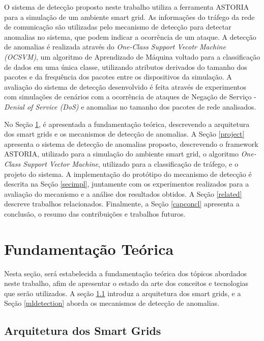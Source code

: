 \documentclass[12pt]{article}
\begin{document}
O sistema de detecção proposto neste trabalho utiliza a ferramenta ASTORIA \cite{wermann2015astoria} para a simulação de um ambiente smart grid. As informações do tráfego da rede de comunicação são utilizadas pelo mecanismo de detecção para detectar anomalias no sistema, que podem indicar a ocorrência de um ataque. A detecção de anomalias é realizada através do \emph{One-Class Support Vecotr Machine (OCSVM)}, um algoritmo de Aprendizado de Máquina voltado para a classificação de dados em uma única classe, utilizando atributos derivados do tamanho dos pacotes e da frequência dos pacotes entre os dispositivos da simulação. A avaliação do sistema de detecção desenvolvido é feita através de experimentos com simulações de cenários com a ocorrência de ataques de Negação de Serviço - \emph{Denial of Service (DoS)} e anomalias no tamanho dos pacotes de rede analisados.

No Seção \ref{stateofart}, é apresentada a fundamentação teórica, descrevendo a arquitetura dos smart grids e os mecanismos de detecção de anomalias. A Seção \ref{project} apresenta o sistema de detecção de anomalias proposto, descrevendo o framework ASTORIA, utilizado para a simulação do ambiente smart grid, o algoritmo \emph{One-Class Support Vector Machine}, utilizado para a classificação de tráfego, e o projeto do sistema. A implementação do protótipo do mecanismo de detecção é descrita na Seção \ref{secimpl}, juntamente com os experimentos realizados para a avaliação do mecanismo e a análise dos resultados obtidos. A Seção \ref{related} descreve trabalhos relacionados. Finalmente, a Seção \ref{capconcl} apresenta a conclusão, o resumo das contribuições e trabalhos futuros.

\section{Fundamentação Teórica}
\label{stateofart}
Nesta seção, será estabelecida a fundamentação teórica dos tópicos abordados neste trabalho, afim de apresentar o estado da arte dos conceitos e tecnologias que serão utilizados. A seção \ref{secarq} introduz a arquitetura dos smart grids, e a Seção \ref{mldetection} aborda os mecanismos de detecção de anomalias.

\subsection{Arquitetura dos Smart Grids}
\label{secarq}
\end{document}
